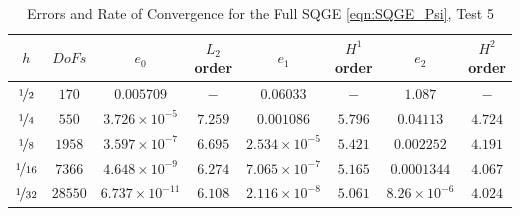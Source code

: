 \begin{table}%
\begin{center}
\begin{tabular}{|c|c|c|c|c|c|c|c|}%
  \hline
  $h$ & $DoFs$ & $e_0$ & $L_2$ order & $e_1$ & $H^1$ order & $e_2$ & $H^2$ order \\[0.2em] %
  \hline
  $\nicefrac{1}{2}$ & $170$ & $0.005709$ & $-$ & $0.06033$ & $-$ & $1.087$ & $-$ \\[0.2em] %
  $\nicefrac{1}{4}$ & $550$ & $3.726\times 10^{-5}$ & $7.259$ & $0.001086$ & $5.796$ & $0.04113$ & $4.724$ \\[0.2em] %
  $\nicefrac{1}{8}$ & $1958$ & $3.597\times 10^{-7}$ & $6.695$ & $2.534\times 10^{-5}$ & $5.421$ & $0.002252$ & $4.191$ \\[0.2em] %
  $\nicefrac{1}{16}$ & $7366$ & $4.648\times 10^{-9}$ & $6.274$ & $7.065\times 10^{-7}$ & $5.165$ & $0.0001344$ & $4.067$\\[0.2em] %
  $\nicefrac{1}{32}$ & $28550$ & $6.737\times 10^{-11}$ & $6.108$ & $2.116\times 10^{-8}$ & $5.061$ & $8.26\times 10^{-6}$ & $4.024$ \\[0.2em] %
 \hline
\end{tabular}
\end{center}
\caption{Errors and Rate of Convergence for the Full SQGE \eqref{eqn:SQGE_Psi}, Test 5}
\label{tab:SQGEsinErrors}
\end{table}

